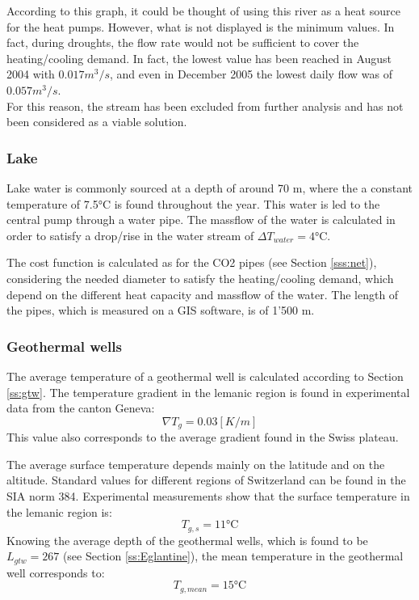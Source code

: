 \documentclass{article}
\begin{document}


According to this graph, it could be thought of using this river as a heat source for the heat pumps. However, what is not displayed is the minimum values. In fact, during droughts, the flow rate would not be sufficient to cover the heating/cooling demand. In fact, the lowest value has been reached in August 2004 with $0.017 m^3/s$, and even in December 2005 the lowest daily flow was of $0.057 m^3/s$. \\
For this reason, the stream has been excluded from further analysis and has not been considered as a viable solution.

\subsubsection{Lake}
Lake water is commonly sourced at a depth of around 70 m, where the a constant temperature of 7.5\si{\celsius} is found throughout the year. This water is led to the central pump through a water pipe. The massflow of the water is calculated in order to satisfy a drop/rise in the water stream of $\Delta T_{water}  = 4 \si{\celsius}$.

The cost function is calculated as for the CO2 pipes (see Section \ref{sss:net}), considering the needed diameter to satisfy the heating/cooling demand, which depend on the different heat capacity and massflow of the water. The length of the pipes, which is measured on a GIS software, is of 1'500 m.


\subsubsection{Geothermal wells}
The average temperature of a geothermal well is calculated according to Section \ref{ss:gtw}. The temperature gradient in the lemanic region is found in experimental data from the canton Geneva\cite{gadzEvaluationPotentielGeothermique2011}:
\begin{equation}
	\nabla T_{g} = 0.03 [K/m]
\end{equation}
This value also corresponds to the average gradient found in the Swiss plateau\cite{siaSIA384Sondes2010}.

The average surface temperature depends mainly on the latitude and on the altitude. Standard values for different regions of Switzerland can be found in the SIA norm 384\cite{siaSIA384Sondes2010}. Experimental measurements\cite{gadzEvaluationPotentielGeothermique2011} show that the surface temperature in the lemanic region is:
\begin{equation}
	T_{g,s} = 11 \si{\celsius}
\end{equation}
Knowing the average depth of the geothermal wells, which is found to be $L_{gtw} = 267$ (see Section \ref{ss:Eglantine}), the mean temperature in the geothermal well corresponds to:
\begin{equation}
	T_{g, mean} = 15 \si{\celsius}
\end{equation}
\end{document}
